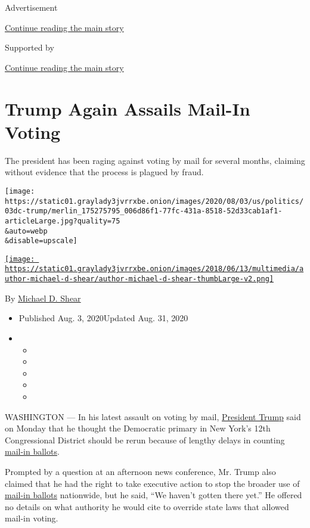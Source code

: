 Advertisement

\protect\hyperlink{after-top}{Continue reading the main story}

Supported by

\protect\hyperlink{after-sponsor}{Continue reading the main story}

\hypertarget{trump-again-assails-mail-in-voting}{%
\section{Trump Again Assails Mail-In
Voting}\label{trump-again-assails-mail-in-voting}}

The president has been raging against voting by mail for several months,
claiming without evidence that the process is plagued by fraud.

\texttt{[image: https://static01.graylady3jvrrxbe.onion/images/2020/08/03/us/politics/03dc-trump/merlin\_175275795\_006d86f1-77fc-431a-8518-52d33cab1af1-articleLarge.jpg?quality=75\\\&auto=webp\\\&disable=upscale]}

\href{https://www.nytimes3xbfgragh.onion/by/michael-d-shear}{\texttt{[image: https://static01.graylady3jvrrxbe.onion/images/2018/06/13/multimedia/author-michael-d-shear/author-michael-d-shear-thumbLarge-v2.png]}}

By \href{https://www.nytimes3xbfgragh.onion/by/michael-d-shear}{Michael
D. Shear}

\begin{itemize}
\item
  Published Aug. 3, 2020Updated Aug. 31, 2020
\item
  \begin{itemize}
  \item
  \item
  \item
  \item
  \item
  \end{itemize}
\end{itemize}

WASHINGTON --- In his latest assault on voting by mail,
\href{https://www.nytimes3xbfgragh.onion/2020/08/13/us/politics/trump-postal-service-mail-voting.html}{President
Trump} said on Monday that he thought the Democratic primary in New
York's 12th Congressional District should be rerun because of lengthy
delays in counting
\href{https://www.nytimes3xbfgragh.onion/interactive/2020/08/31/us/politics/vote-by-mail-deadlines.html}{mail-in
ballots}.

Prompted by a question at an afternoon news conference, Mr. Trump also
claimed that he had the right to take executive action to stop the
broader use of
\href{https://www.nytimes3xbfgragh.onion/2020/08/26/us/politics/mail-in-voting-foreign-intervention.html}{mail-in
ballots} nationwide, but he said, ``We haven't gotten there yet.'' He
offered no details on what authority he would cite to override state
laws that allowed mail-in voting.

